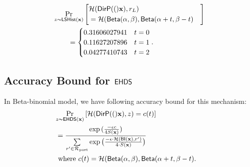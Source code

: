 \documentclass{article}
\begin{document}
\begin{align*}
&\ilapmechPr{\dataobs}{
\begin{aligned}
\lefteqn{\hellinger(\bysinfer(\dataobs), r_L )}\\ 
&= \hellinger(\betad(\alpha, \beta), \betad(\alpha + t, \beta - t)
\end{aligned}
}\\
& \qquad = \begin{cases}
0.31606027941 & t = 0\\
0.11627207896 & t = 1\\
0.04277410743 & t = 2
\end{cases}.
\end{align*}

\subsection{Accuracy Bound for $\mathsf{EHDS}$}
\label{subsec_accuracy_smoo}
\begin{lem}
\label{lem_acc_hexp}
  In Beta-binomial model,
  we have following accuracy bound for this mechanism:
%
  \begin{align*}
  \lefteqn{ \hexpmechPr{\dataobs}{\hellinger(\bysinfer(\dataobs), z) = c(t)  } }\\ 
  &  = \frac{\exp{(\frac{- \epsilon c}{4 S(\dataobs)})}}{\nomalizer{\dataobs}}\\
  & \text{ where } c(t) = \hellinger(\betad(\alpha, \beta), \betad(\alpha + t, \beta - t).
  \end{align*}
\end{lem}
\end{document}
